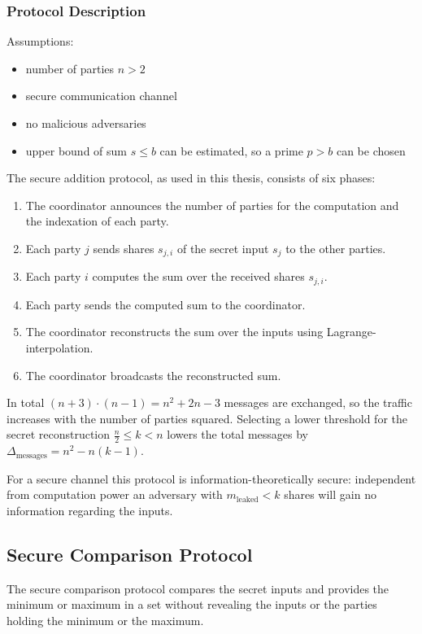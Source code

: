		\subsubsection*{Protocol Description}
		Assumptions:
		\begin{itemize}
			\item number of parties $n>2$
			\item secure communication channel
			\item no malicious adversaries
			\item upper bound of sum $s \leq b$ can be estimated, so a prime $p > b$ can be chosen 
		\end{itemize}
		The secure addition protocol, as used in this thesis, consists of six phases:
		\begin{enumerate}
		\item The coordinator announces the number of parties for the computation and the indexation of each party.
		\item Each party $j$ sends shares $s_{j,i}$ of the secret input $s_j$ to the other parties.
		\item Each party $i$ computes the sum over the received shares $s_{j,i}$.
		\item Each party sends the computed sum to the coordinator.
		\item The coordinator reconstructs the sum over the inputs using Lagrange-interpolation.
		\item The coordinator broadcasts the reconstructed sum.
		\end{enumerate}
	
		In total $(n+3)\cdot (n-1)=n^2+2n-3$ messages are exchanged, so the traffic increases with the number of parties squared. Selecting a lower threshold for the secret reconstruction $\frac{n}{2} \leq k<n$ lowers the total messages by $\Delta_{\text{messages}}=n^2-n(k-1)$.
		
		For a secure channel this protocol is information-theoretically secure: independent from computation power an adversary with $m_\text{leaked}<k$ shares will gain no information regarding the inputs.
	
		
		\subsection{Secure Comparison Protocol}	\label{Secure Comparison Protocol}
		The secure comparison protocol compares the secret inputs and provides the minimum or maximum in a set without revealing the inputs or the parties holding the minimum or the maximum.
		
